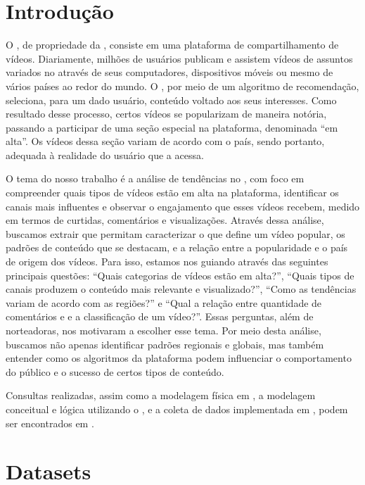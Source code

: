 \chapter{Introdução}

  O  , de propriedade da , consiste em uma plataforma 
  de compartilhamento de vídeos. Diariamente, milhões de usuários publicam e assistem vídeos de assuntos
  variados no  através de seus computadores,
  dispositivos móveis ou mesmo  de vários países ao redor do mundo. O , por meio de um
  algoritmo de recomendação, seleciona, para um dado usuário, conteúdo voltado aos seus interesses. Como resultado desse processo,
  certos vídeos se popularizam de maneira notória, passando a participar de uma seção especial na plataforma, denominada
  ``em alta''.  Os vídeos dessa seção variam de acordo com o país, sendo portanto, adequada à realidade do usuário que a acessa.

  O tema do nosso trabalho é a análise de tendências no , com foco em compreender quais tipos de vídeos estão em alta na plataforma, identificar os canais mais influentes e observar o engajamento que esses vídeos recebem, medido em termos de curtidas, comentários e visualizações. Através dessa análise, buscamos extrair  que permitam caracterizar o que define um vídeo popular, os padrões de conteúdo que se destacam, e a relação entre a popularidade e o país de origem dos vídeos. Para isso, estamos nos guiando através das seguintes principais questões: ``Quais categorias de vídeos estão em alta?'', ``Quais tipos de canais produzem o conteúdo mais relevante e visualizado?'', ``Como as tendências variam de acordo com as regiões?'' e ``Qual a relação entre quantidade de comentários e  e a classificação de um vídeo?''. Essas perguntas, além de norteadoras, nos motivaram a escolher esse tema. Por meio desta análise, buscamos não apenas identificar padrões regionais e globais, mas também entender como os algoritmos da plataforma podem influenciar o comportamento do público e o sucesso de certos tipos de conteúdo.

  Consultas realizadas, assim como a modelagem física em , a modelagem conceitual e lógica utilizando
  o , e a coleta de dados implementada em , podem ser encontrados
  em \cite{our-YoutubeScraperDataBank}.

\chapter{Datasets}

